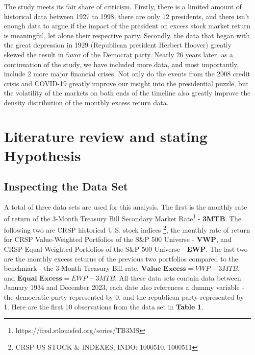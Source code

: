 \documentclass[a4paper]{article}
\begin{document}
  The study meets its fair share of criticism. Firstly, there is a limited amount of historical data between 1927 to 1998, there are only 12 presidents, and there isn't enough data to argue if the impact of the president on excess stock market return is meaningful, let alone their respective party. Secondly, the data that began with the great depression in 1929 (Republican president Herbert Hoover) greatly skewed the result in favor of the Democrat party. Nearly 26 years later, as a continuation of the study, we have included more data, and most importantly, include 2 more major financial crises. Not only do the events from the 2008 credit crisis and COVID-19 greatly improve our insight into the presidential puzzle, but the volatility of the markets on both ends of the timeline also greatly improve the density distribution of the monthly excess return data. 
  
  
\vspace{-10pt}
\section{Literature review and stating Hypothesis}\label{Review and Hypothesis}
\vspace{-10pt}
\subsection{Inspecting the Data Set} \label{Inspecting the Data Set}
\vspace{-5pt}

  \hspace{12pt} A total of three data sets are used for this analysis. The first is the monthly rate of return of the 3-Month Treasury Bill Secondary Market Rate\footnote{https://fred.stlouisfed.org/series/TB3MS} - \textbf{3MTB}. The following two are CRSP historical U.S. stock indices \footnote{CRSP US STOCK \& INDEXES, INDO: 1000510, 1000511}, the monthly rate of return for CRSP Value-Weighted Portfolios of the S\&P 500 Universe - \textbf{VWP}, and CRSP Equal-Weighted Portfolios of the S\&P 500 Universe - \textbf{EWP}. The last two are the monthly excess returns of the previous two portfolios compared to the benchmark - the 3-Month Treasury Bill rate, $\textbf{Value Excess} = VWP - 3MTB$, and $\textbf{Equal Excess} = EWP - 3MTB$. All these data sets contain data between January 1934 and December 2023, each date also references a dummy variable - the democratic party represented by 0, and the republican party represented by 1. 
  Here are the first 10 observations from the data set in \textbf{Table 1}.
\end{document}
